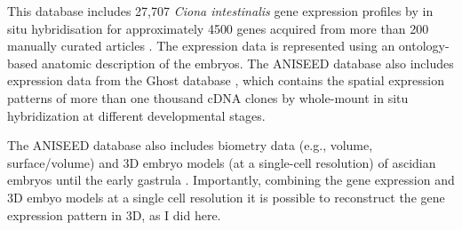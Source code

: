 This database includes 27,707 \textit{Ciona intestinalis} gene expression profiles by in situ hybridisation for approximately 4500 genes acquired from more than 200 manually curated articles \citep{Brozovic2016}.
%
The expression data is represented using an ontology-based anatomic description of the embryos. The ANISEED database also includes expression data from the Ghost database \citep{Satou2005}, which contains the spatial expression patterns of more than one thousand cDNA clones by whole-mount in situ hybridization at different developmental stages.

The ANISEED database also includes biometry data (e.g., volume, surface/volume) and 3D embryo models (at a single-cell resolution) of ascidian embryos until the early gastrula \citep{Tassy2006}. Importantly, combining the gene expression and 3D embyo models at a single cell resolution it is possible to reconstruct the gene expression pattern in 3D, as I did here. 


